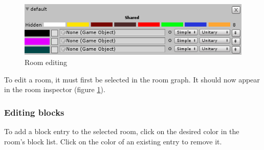 \documentclass[a4paper]{article}
\begin{document}
	\begin{figure}[h]
		\includegraphics[width=\linewidth]{img/Menu_EditRoom.PNG}
		\caption{Room editing}
		\label{fig:edit_room}
	\end{figure}
	
	To edit a room, it must first be selected in the room graph. It should now appear in the room inspector (figure \ref{fig:edit_room}). 
	
	\subsubsection{Editing blocks}
	To add a block entry to the selected room, click on the desired color in the room's block list. Click on the color of an existing entry to remove it.  
\end{document}
